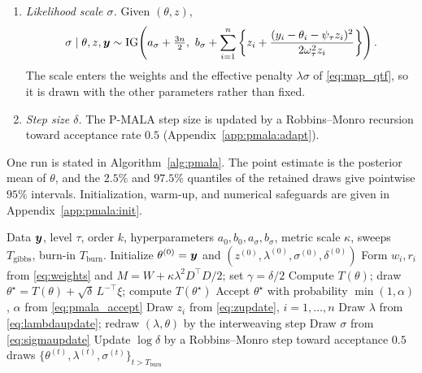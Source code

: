 \begin{enumerate}
    \item \emph{Likelihood scale $\sigma$.} Given $(\theta, z)$,
    \begin{equation}
        \sigma \mid \theta, z, \bm{y} \sim \mathrm{IG}\!\left(a_\sigma + \tfrac{3n}{2},\ b_\sigma + \sum_{i=1}^n \left\{ z_i + \frac{(y_i - \theta_i - \psi_\tau z_i)^2}{2\omega_\tau^2 z_i}\right\}\right).
        \label{eq:sigmaupdate}
    \end{equation}
    The scale enters the weights and the effective penalty $\lambda\sigma$ of \eqref{eq:map_qtf}, so it is drawn with the other parameters rather than fixed.
    \item \emph{Step size $\delta$.} The P-MALA step size is updated by a Robbins--Monro recursion toward acceptance rate $0.5$ (Appendix~\ref{app:pmala:adapt}).
\end{enumerate}
One run is stated in Algorithm~\ref{alg:pmala}. The point estimate is the posterior mean of $\theta$, and the $2.5\%$ and $97.5\%$ quantiles of the retained draws give pointwise $95\%$ intervals. Initialization, warm-up, and numerical safeguards are given in Appendix~\ref{app:pmala:init}.

\begin{algorithm}[h!]
\caption{Bayesian-PMALA for a single quantile level $\tau$}
\label{alg:pmala}
\begin{algorithmic}[1]
\Require Data $\bm{y}$, level $\tau$, order $k$, hyperparameters $a_0, b_0, a_\sigma, b_\sigma$, metric scale $\kappa$, sweeps $T_{\mathrm{gibbs}}$, burn-in $T_{\mathrm{burn}}$.
\State Initialize $\theta^{(0)} = \bm{y}$ and $(z^{(0)}, \lambda^{(0)}, \sigma^{(0)}, \delta^{(0)})$ 
 
    \State Form $w_i, r_i$ from \eqref{eq:weights} and $M = W + \kappa\lambda^2 D^\top D/2$; set $\gamma = \delta/2$
    \State Compute $T(\theta)$; draw $\theta^\star = T(\theta) + \sqrt{\delta}\,L^{-\top}\xi$; compute $T(\theta^\star)$ 
    \State Accept $\theta^\star$ with probability $\min(1,\alpha)$, $\alpha$ from \eqref{eq:pmala_accept}
    \State Draw $z_i$ from \eqref{eq:zupdate}, $i = 1, \ldots, n$
    \State Draw $\lambda$ from \eqref{eq:lambdaupdate}; redraw $(\lambda, \theta)$ by the interweaving step
    \State Draw $\sigma$ from \eqref{eq:sigmaupdate}
    \State Update $\log\delta$ by a Robbins--Monro step toward acceptance $0.5$
\EndFor
\State \Return draws $\{\theta^{(t)}, \lambda^{(t)}, \sigma^{(t)}\}_{t > T_{\mathrm{burn}}}$
\end{algorithmic}
\end{algorithm}

